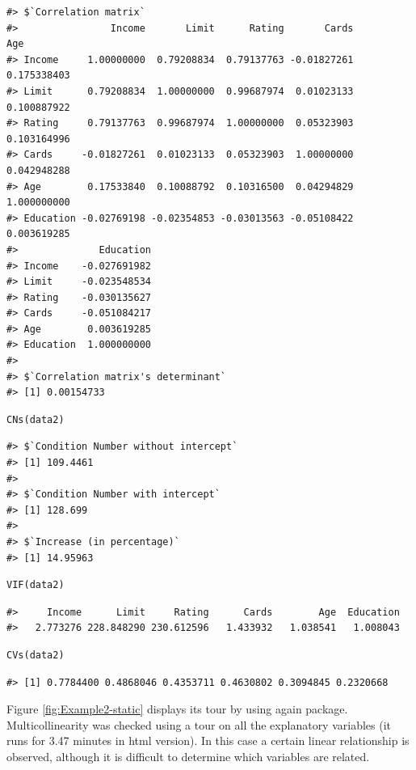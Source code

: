 \begin{verbatim}
#> $`Correlation matrix`
#>                Income       Limit      Rating       Cards         Age
#> Income     1.00000000  0.79208834  0.79137763 -0.01827261 0.175338403
#> Limit      0.79208834  1.00000000  0.99687974  0.01023133 0.100887922
#> Rating     0.79137763  0.99687974  1.00000000  0.05323903 0.103164996
#> Cards     -0.01827261  0.01023133  0.05323903  1.00000000 0.042948288
#> Age        0.17533840  0.10088792  0.10316500  0.04294829 1.000000000
#> Education -0.02769198 -0.02354853 -0.03013563 -0.05108422 0.003619285
#>              Education
#> Income    -0.027691982
#> Limit     -0.023548534
#> Rating    -0.030135627
#> Cards     -0.051084217
#> Age        0.003619285
#> Education  1.000000000
#> 
#> $`Correlation matrix's determinant`
#> [1] 0.00154733
\end{verbatim}

\begin{verbatim}
CNs(data2)
\end{verbatim}

\begin{verbatim}
#> $`Condition Number without intercept`
#> [1] 109.4461
#> 
#> $`Condition Number with intercept`
#> [1] 128.699
#> 
#> $`Increase (in percentage)`
#> [1] 14.95963
\end{verbatim}

\begin{verbatim}
VIF(data2)
\end{verbatim}

\begin{verbatim}
#>     Income      Limit     Rating      Cards        Age  Education 
#>   2.773276 228.848290 230.612596   1.433932   1.038541   1.008043
\end{verbatim}

\begin{verbatim}
CVs(data2)
\end{verbatim}

\begin{verbatim}
#> [1] 0.7784400 0.4868046 0.4353711 0.4630802 0.3094845 0.2320668
\end{verbatim}

Figure \ref{fig:Example2-static} displays its tour by using again  package. Multicollinearity was checked using a tour on all the explanatory variables (it runs for 3.47 minutes in html version). In this case a certain linear relationship is observed, although it is difficult to determine which variables are related.

